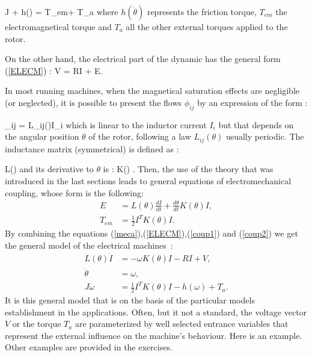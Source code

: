 \eqn \label{meca}
J \ddot \theta + h(\dot \theta) = T_{em}+ T_a 
\eeqn
where $h(\dot \theta)$ represents the friction torque, $T_{em}$ the electromagnetical torque and $T_a$ all the other external torques applied to the rotor. 

On the other hand, the electrical part of the dynamic has the general form (\ref{ELECM}) :
\eqnn
V = RI + E. 
\eeqnn

In most running machines, when the magnetical saturation effects are negligible (or neglected), it is possible to present the flows $\phi_{ij}$ by an expression of the form : 

\eqnn
\phi_{ij} = L_{ij}(\theta)I_i
\eeqnn
which is linear to the inductor current $I_i$ but that depends on the angular position $\theta$ of the rotor, following a law $L_{ij}(\theta)$ usually periodic. The inductance matrix (symmetrical) is defined as : 

\eqnn
L(\theta) \triangleq [L_{ij}(\theta)]
\eeqnn
and its derivative to $\theta$ is : 
\eqnn
K(\theta) \triangleq {}.
\eeqnn
Then, the use of the theory that was introduced in the last sections leads to general equations of electromechanical coupling, whose form is the following: 
\begin{align}
E &= L(\theta)\frac{dI}{dt} + \frac{d\theta}{dt}K(\theta)I, \label{coup1}\\
T_{em} &= \frac{1}{2}I^TK(\theta)I. \label{coup2}
\end{align}
By combining the equations (\ref{meca}),(\ref{ELECM}),(\ref{coup1}) and (\ref{coup2}) we get the general model of the electrical machines~: 
\begin{equation*} \begin{split}
L(\theta)\dot I &= - \omega K(\theta) I - RI + V, \\
\dot \theta &= \omega, \\
J \dot \omega &= \frac{1}{2} I^TK(\theta)I - h(\omega) + T_a.
\end{split} \end{equation*}
It is this general model that is on the basis of the particular models establishment in the applications. Often, but it not a standard, the voltage vector $V$ or the torque $T_a$ are parameterized by  well selected entrance variables that represent the external influence on the machine’s behaviour. Here is an example. Other examples are provided in the exercises. 

